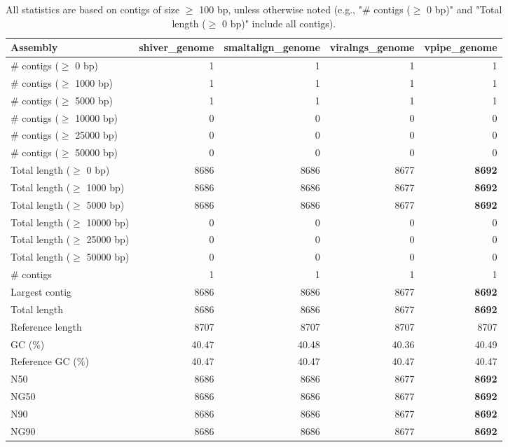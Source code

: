 \documentclass[12pt,a4paper]{article}
\begin{document}
\begin{table}[ht]
\begin{center}
\caption{All statistics are based on contigs of size $\geq$ 100 bp, unless otherwise noted (e.g., "\# contigs ($\geq$ 0 bp)" and "Total length ($\geq$ 0 bp)" include all contigs).}
\begin{tabular}{|l*{4}{|r}|}
\hline
Assembly & shiver\_genome & smaltalign\_genome & viralngs\_genome & vpipe\_genome \\ \hline
\# contigs ($\geq$ 0 bp) & 1 & 1 & 1 & 1 \\ \hline
\# contigs ($\geq$ 1000 bp) & 1 & 1 & 1 & 1 \\ \hline
\# contigs ($\geq$ 5000 bp) & 1 & 1 & 1 & 1 \\ \hline
\# contigs ($\geq$ 10000 bp) & 0 & 0 & 0 & 0 \\ \hline
\# contigs ($\geq$ 25000 bp) & 0 & 0 & 0 & 0 \\ \hline
\# contigs ($\geq$ 50000 bp) & 0 & 0 & 0 & 0 \\ \hline
Total length ($\geq$ 0 bp) & 8686 & 8686 & 8677 & {\bf 8692} \\ \hline
Total length ($\geq$ 1000 bp) & 8686 & 8686 & 8677 & {\bf 8692} \\ \hline
Total length ($\geq$ 5000 bp) & 8686 & 8686 & 8677 & {\bf 8692} \\ \hline
Total length ($\geq$ 10000 bp) & 0 & 0 & 0 & 0 \\ \hline
Total length ($\geq$ 25000 bp) & 0 & 0 & 0 & 0 \\ \hline
Total length ($\geq$ 50000 bp) & 0 & 0 & 0 & 0 \\ \hline
\# contigs & 1 & 1 & 1 & 1 \\ \hline
Largest contig & 8686 & 8686 & 8677 & {\bf 8692} \\ \hline
Total length & 8686 & 8686 & 8677 & {\bf 8692} \\ \hline
Reference length & 8707 & 8707 & 8707 & 8707 \\ \hline
GC (\%) & 40.47 & 40.48 & 40.36 & 40.49 \\ \hline
Reference GC (\%) & 40.47 & 40.47 & 40.47 & 40.47 \\ \hline
N50 & 8686 & 8686 & 8677 & {\bf 8692} \\ \hline
NG50 & 8686 & 8686 & 8677 & {\bf 8692} \\ \hline
N90 & 8686 & 8686 & 8677 & {\bf 8692} \\ \hline
NG90 & 8686 & 8686 & 8677 & {\bf 8692} \\ \hline

\end{tabular}
\end{center}
\end{table}
\end{document}
